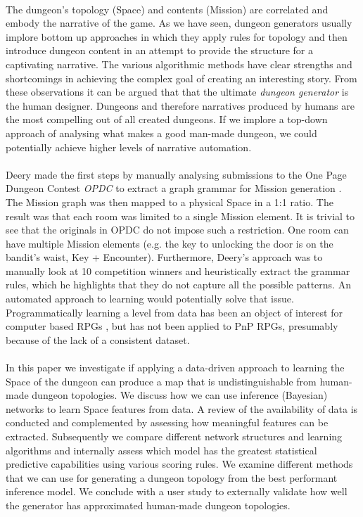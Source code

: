 \documentclass{UoYCSproject}
\begin{document}
\paragraph{}
The dungeon’s topology (Space) and contents (Mission) are correlated and embody the narrative of the game. As we have seen, dungeon generators usually implore bottom up approaches in which they apply rules for topology and then introduce dungeon content in an attempt to provide the structure for a captivating narrative. The various algorithmic methods have clear strengths and shortcomings in achieving the complex goal of creating an interesting story. From these observations it can be argued that that the ultimate \textit{dungeon generator} is the human designer. Dungeons and therefore narratives produced by humans are the most compelling out of all created dungeons. If we implore a top-down approach of analysing what makes a good man-made dungeon, we could potentially achieve higher levels of narrative automation.
\paragraph{}
Deery made the first steps by manually analysing submissions to the One Page Dungeon Contest \textit{OPDC} \parencite{OPDC} to extract a graph grammar for Mission generation \parencite{Deery}. The Mission graph was then mapped to a physical Space in a 1:1 ratio. The result was that each room was limited to a single Mission element. It is trivial to see that the originals in OPDC do not impose such a restriction. One room can have multiple Mission elements (e.g. the key to unlocking the door is on the bandit’s waist, Key + Encounter). Furthermore, Deery’s approach was to manually look at 10 competition winners and heuristically extract the grammar rules, which he highlights that they do not capture all the possible patterns. An automated approach to learning would potentially solve that issue. Programmatically learning a level from data has been an object of interest for computer based RPGs \parencite{SummervilleLearningOfZelda}, but has not been applied to PnP RPGs, presumably because of the lack of a consistent dataset.

\paragraph{}
In this paper we investigate if applying a data-driven approach to learning the Space of the dungeon can produce a map that is undistinguishable from human-made dungeon topologies. We discuss how we can use inference (Bayesian) networks to learn Space features from data. A review of the availability of data is conducted and complemented by assessing how meaningful features can be extracted. Subsequently we compare different network structures and learning algorithms and internally assess which model has the greatest statistical predictive capabilities using various scoring rules. We examine different methods that we can use for generating a dungeon topology from the best performant inference model. We conclude with a user study to externally validate how well the generator has approximated human-made dungeon topologies.
\end{document}
